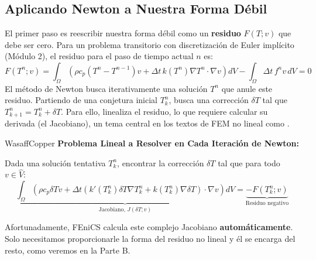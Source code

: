 \subsection{Aplicando Newton a Nuestra Forma Débil}
El primer paso es reescribir nuestra forma débil como un \textbf{residuo} $F(T;v)$ que debe ser cero. Para un problema transitorio con discretización de Euler implícito (Módulo 2), el residuo para el paso de tiempo actual $n$ es:
\begin{equation}
    F(T^n; v) = \int_{\Omega} \left( \rho c_p (T^n - T^{n-1}) v + \Delta t \, k(T^n) \nabla T^n \cdot \nabla v \right) dV - \int_{\Omega} \Delta t \, f^n v \, dV = 0
\end{equation}
El método de Newton busca iterativamente una solución $T^n$ que anule este residuo. Partiendo de una conjetura inicial $T_k^n$, busca una corrección $\delta T$ tal que $T_{k+1}^n = T_k^n + \delta T$. Para ello, linealiza el residuo, lo que requiere calcular su derivada (el Jacobiano), un tema central en los textos de FEM no lineal como \cite{bazant2003}.

\begin{keybox}{WasaffCopper}
    \textbf{Problema Lineal a Resolver en Cada Iteración de Newton:}
    
    Dada una solución tentativa $T_k^n$, encontrar la corrección $\delta T$ tal que para todo $v \in \hat{V}$:
    \begin{equation}
        \underbrace{\int_{\Omega} \left( \rho c_p \delta T v + \Delta t (k'(T_k^n) \delta T \nabla T_k^n + k(T_k^n) \nabla \delta T) \cdot \nabla v \right) dV}_{\text{Jacobiano, } J(\delta T; v)} = \underbrace{-F(T_k^n; v)}_{\text{Residuo negativo}}
    \end{equation}
\end{keybox}

Afortunadamente, FEniCS calcula este complejo Jacobiano \textbf{automáticamente}. Solo necesitamos proporcionarle la forma del residuo no lineal y él se encarga del resto, como veremos en la Parte B.
